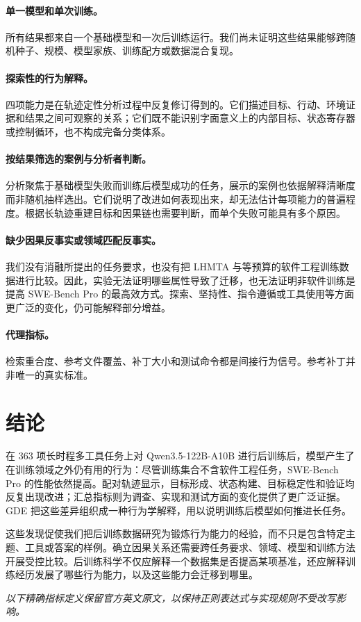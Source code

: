 \documentclass[10pt]{article}
\begin{document}
\paragraph{单一模型和单次训练。}
所有结果都来自一个基础模型和一次后训练运行。我们尚未证明这些结果能够跨随机种子、规模、模型家族、训练配方或数据混合复现。

\paragraph{探索性的行为解释。}
四项能力是在轨迹定性分析过程中反复修订得到的。它们描述目标、行动、环境证据和结果之间可观察的关系；它们既不能识别字面意义上的内部目标、状态寄存器或控制循环，也不构成完备分类体系。

\paragraph{按结果筛选的案例与分析者判断。}
分析聚焦于基础模型失败而训练后模型成功的任务，展示的案例也依据解释清晰度而非随机抽样选出。它们说明了改进如何表现出来，却无法估计每项能力的普遍程度。根据长轨迹重建目标和因果链也需要判断，而单个失败可能具有多个原因。

\paragraph{缺少因果反事实或领域匹配反事实。}
我们没有消融所提出的任务要求，也没有把 LHMTA 与等预算的软件工程训练数据进行比较。因此，实验无法证明哪些属性导致了迁移，也无法证明非软件训练是提高 SWE-Bench Pro 的最高效方式。探索、坚持性、指令遵循或工具使用等方面更广泛的变化，仍可能解释部分增益。

\paragraph{代理指标。}
检索重合度、参考文件覆盖、补丁大小和测试命令都是间接行为信号。参考补丁并非唯一的真实标准。

\section{结论}
\label{sec:conclusion}

在 363 项长时程多工具任务上对 Qwen3.5-122B-A10B 进行后训练后，模型产生了在训练领域之外仍有用的行为：尽管训练集合不含软件工程任务，SWE-Bench Pro 的性能依然提高。配对轨迹显示，目标形成、状态构建、目标稳定性和验证均反复出现改进；汇总指标则为调查、实现和测试方面的变化提供了更广泛证据。GDE 把这些差异组织成一种行为学解释，用以说明训练后模型如何推进长任务。

这些发现促使我们把后训练数据研究为锻炼行为能力的经验，而不只是包含特定主题、工具或答案的样例。确立因果关系还需要跨任务要求、领域、模型和训练方法开展受控比较。后训练科学不仅应解释一个数据集是否提高某项基准，还应解释训练经历发展了哪些行为能力，以及这些能力会迁移到哪里。




\appendix
\begin{center}
\small\emph{以下精确指标定义保留官方英文原文，以保持正则表达式与实现规则不受改写影响。}
\end{center}

\end{document}
